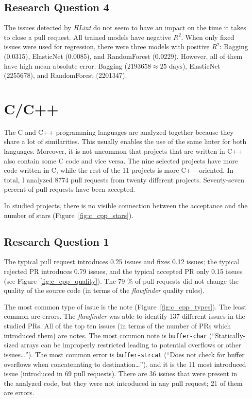 \documentclass[digital,oneside,oldtable,nolof,nolot,nocover]{fithesis4}
\begin{document}
\subsection{Research Question 4}
\label{sec:org1da1afc}
The issues detected by \emph{HLint} do not seem to have an impact on the time it takes to close a pull request.
All trained models have negative \(R^2\). When only fixed issues were used for regression, there
were three models with positive \(R^2\): Bagging (0.0315), ElasticNet (0.0085), and RandomForest (0.0229).
However, all of them have high mean absolute error: Bagging (\(2193658 \approx 25\text{ days}\)),
ElasticNet (2255678), and RandomForest (2201347).
\FloatBarrier
\section{C/C++}
\label{sec:org7429093}
The C and C++ programming languages are analyzed together because they share
a lot of similarities.  This usually enables the use of the same linter for both
languages. Moreover, it is not uncommon that projects that are written in C++
also contain some C code and vice versa.
The nine selected projects have more code written in C, while the rest of the
11 projects is more C++-oriented. In total, I analyzed 8774 pull requests
from twenty different projects. Seventy-seven percent of pull requests have been accepted.

In studied projects, there is no visible connection between the acceptance
and the number of stars (Figure~\ref{fig:c_cpp_stars}).
\subsection{Research Question 1}
\label{sec:org9173599}
The typical pull request introduces 0.25 issues and fixes 0.12 issues; the typical
rejected PR introduces 0.79 issues, and the typical accepted PR only 0.15 issues (see Figure~\ref{fig:c_cpp_quality}).
The 79 \% of pull requests did not change the quality of the source code
(in terms of the \emph{flawfinder} quality rules).

The most common type of issue is the note (Figure~\ref{fig:c_cpp_types}).
The least common are errors. The \emph{flawfinder} was able to identify 137 different issues in the studied
PRs. All of the top ten issues (in terms of the number of PRs which introduced
them) are notes. The most common note is \texttt{buffer-char} (``Statically-sized
arrays can be improperly restricted leading to potential overflows or other
issues\dots{}''). The most common error is \texttt{buffer-strcat} (``Does not check
for buffer overflows when concatenating to destination\dots{}''), and it is the
11 most introduced issue (introduced in 69 pull requests). There are 36 issues
that were present in the analyzed code, but they were not introduced in any
pull request; 21 of them are errors.
\end{document}
